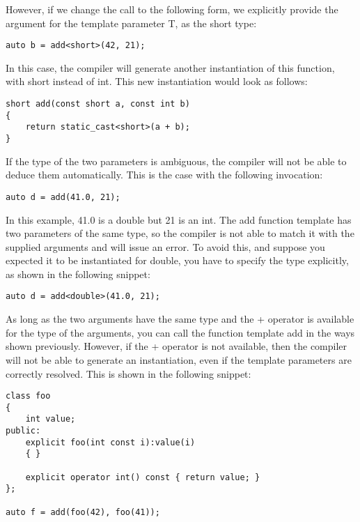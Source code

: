 However, if we change the call to the following form, we explicitly provide the argument for the template parameter T, as the short type:

\begin{lstlisting}[style=styleCXX]
auto b = add<short>(42, 21);
\end{lstlisting}

In this case, the compiler will generate another instantiation of this function, with short instead of int. This new instantiation would look as follows:

\begin{lstlisting}[style=styleCXX]
short add(const short a, const int b)
{
	return static_cast<short>(a + b);
}
\end{lstlisting}

If the type of the two parameters is ambiguous, the compiler will not be able to deduce them automatically. This is the case with the following invocation:

\begin{lstlisting}[style=styleCXX]
auto d = add(41.0, 21);
\end{lstlisting}

In this example, 41.0 is a double but 21 is an int. The add function template has two parameters of the same type, so the compiler is not able to match it with the supplied arguments and will issue an error. To avoid this, and suppose you expected it to be instantiated for double, you have to specify the type explicitly, as shown in the following snippet:

\begin{lstlisting}[style=styleCXX]
auto d = add<double>(41.0, 21);
\end{lstlisting}

As long as the two arguments have the same type and the + operator is available for the type of the arguments, you can call the function template add in the ways shown previously. However, if the + operator is not available, then the compiler will not be able to generate an instantiation, even if the template parameters are correctly resolved. This is shown in the following snippet:

\begin{lstlisting}[style=styleCXX]
class foo
{
	int value;
public:
	explicit foo(int const i):value(i)
	{ }
	
	explicit operator int() const { return value; }
};

auto f = add(foo(42), foo(41));
\end{lstlisting}

